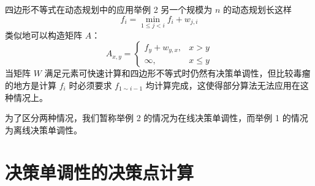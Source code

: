 \documentclass{beamer}
\begin{document}
\begin{frame}{四边形不等式在动态规划中的应用举例 2}
	另一个规模为 $n$ 的动态规划长这样 $$f_i= \min_{1 \leq j < i} f_i + w_{j,i}$$ 类似地可以构造矩阵 $A$：$$ A_{x,y} = \begin{cases}
	f_{y} + w_{y,x}, & x>y\\
	\infty, & x \leq y
	\end{cases} $$
	当矩阵 $W$ 满足元素可快速计算和四边形不等式时仍然有决策单调性，但比较毒瘤的地方是计算 $f_i$ 时必须要求 $f_{1 \sim i-1}$ 均计算完成，这使得部分算法无法应用在这种情况上。
	
	为了区分两种情况，我们暂称举例 2 的情况为在线决策单调性，而举例 1 的情况为离线决策单调性。
\end{frame}
\section{决策单调性的决策点计算}
\end{document}

